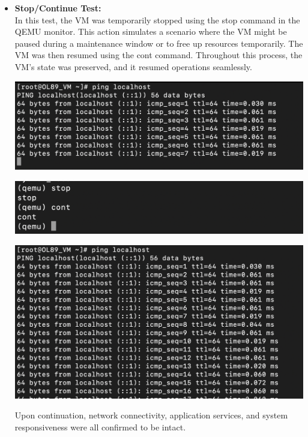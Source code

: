 \begin{itemize}
    \item \textbf{Stop/Continue Test:}\\
          In this test, the VM was temporarily stopped using the stop command in the QEMU monitor. This action simulates a scenario where the VM might be paused during a maintenance window or to free up resources temporarily. The VM was then resumed using the cont command. Throughout this process, the VM's state was preserved, and it resumed operations seamlessly.
          \begin{center}
              \includegraphics[width=\linewidth]{Images/Ping Localhost When Stop.png}
              \label{fig:areboot}
          \end{center}
          \begin{center}
              \includegraphics[width=\linewidth]{Images/Stop-Cont Commands.png}
              \label{fig:areboot}
          \end{center}
          \begin{center}
              \includegraphics[width=\linewidth]{Images/Ping Localhost After Cont.png}
              \label{fig:areboot}
          \end{center}
          Upon continuation, network connectivity, application services, and system responsiveness were all confirmed to be intact.


\end{itemize}
